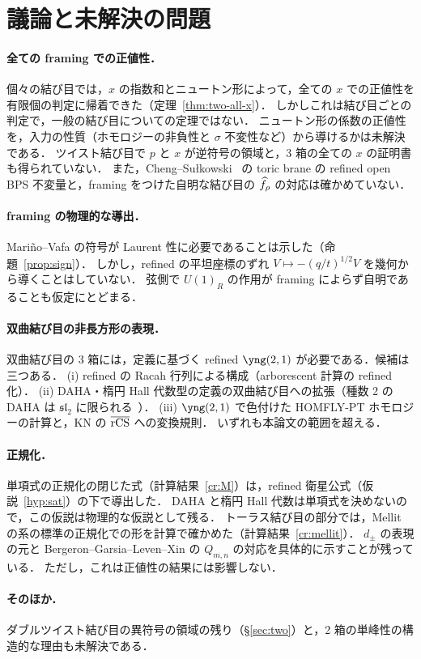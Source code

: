 \section{議論と未解決の問題}\label{sec:discussion}

\paragraph{全ての framing での正値性．}
個々の結び目では，$x$ の指数和とニュートン形によって，全ての $x$ での正値性を有限個の判定に帰着できた（定理~\ref{thm:two-all-x}）．
しかしこれは結び目ごとの判定で，一般の結び目についての定理ではない．
ニュートン形の係数の正値性を，入力の性質（ホモロジーの非負性と $\sigma$ 不変性など）から導けるかは未解決である．
ツイスト結び目で $p$ と $x$ が逆符号の領域と，3 箱の全ての $x$ の証明書も得られていない．
また，Cheng--Sułkowski~\cite{Cheng21} の toric brane の refined open BPS 不変量と，framing をつけた自明な結び目の $\widehat{f}_\rho$ の対応は確かめていない．

\paragraph{framing の物理的な導出．}
Mariño--Vafa の符号が Laurent 性に必要であることは示した（命題~\ref{prop:sign}）．
しかし，refined の平坦座標のずれ $V\mapsto-(q/t)^{1/2}V$ を幾何から導くことはしていない．
弦側で $U(1)_R$ の作用が framing によらず自明であることも仮定にとどまる．

\paragraph{双曲結び目の非長方形の表現．}
双曲結び目の 3 箱には，定義に基づく refined $\yng(2,1)$ が必要である．候補は三つある．
(i) refined の Racah 行列による構成（arborescent 計算の refined 化）．
(ii) DAHA・楕円 Hall 代数型の定義の双曲結び目への拡張（種数 2 の DAHA は $\mathfrak{sl}_2$ に限られる~\cite{Arthamonov15}）．
(iii) $\yng(2,1)$ で色付けた HOMFLY-PT ホモロジーの計算と，KN の $\overline{\textrm{rCS}}$ への変換規則．
いずれも本論文の範囲を超える．

\paragraph{正規化．}
単項式の正規化の閉じた式（計算結果~\ref{cr:M}）は，refined 衛星公式（仮説~\ref{hyp:sat}）の下で導出した．
DAHA と楕円 Hall 代数は単項式を決めないので，この仮説は物理的な仮説として残る．
トーラス結び目の部分では，Mellit の系の標準の正規化での形を計算で確かめた（計算結果~\ref{cr:mellit}）．
$d_\pm$ の表現の元と Bergeron--Garsia--Leven--Xin の $Q_{m,n}$ の対応を具体的に示すことが残っている．
ただし，これは正値性の結果には影響しない．

\paragraph{そのほか．}
ダブルツイスト結び目の異符号の領域の残り（\S\ref{sec:two}）と，2 箱の単峰性の構造的な理由も未解決である．
